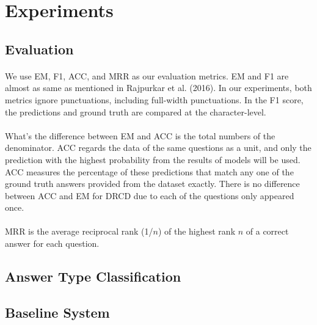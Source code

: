 \documentclass{article}
\begin{document}
\section{Experiments}
\paragraph{}

\subsection{Evaluation}
\paragraph{}
We use EM, F1, ACC, and MRR as our evaluation metrics. EM and F1 are almost as same as mentioned in Rajpurkar et al. (2016)\cite{rajpurkar2016squad}. In our experiments, both metrics ignore punctuations, including full-width punctuations. In the F1 score, the predictions and ground truth are compared at the character-level.

\paragraph{}
What's the difference between EM and ACC is the total numbers of the denominator. ACC regards the data of the same questions as a unit, and only the prediction with the highest probability from the results of models will be used. ACC measures the percentage of these predictions that match any one of the ground truth answers provided from the dataset exactly. There is no difference between ACC and EM for DRCD due to each of the questions only appeared once.

\paragraph{}
MRR is the average reciprocal rank (1/$n$) of the highest rank $n$ of a correct answer for each question.

\subsection{Answer Type Classification}
\paragraph{}


\subsection{Baseline System}
\end{document}
